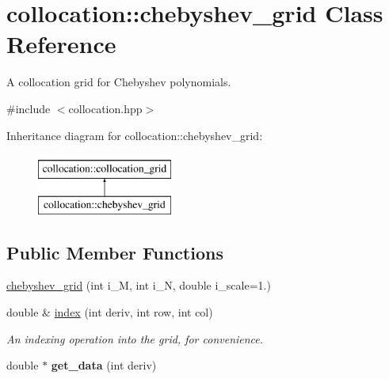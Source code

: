 \hypertarget{classcollocation_1_1chebyshev__grid}{\section{collocation\-:\-:chebyshev\-\_\-grid Class Reference}
\label{classcollocation_1_1chebyshev__grid}
}


A collocation grid for Chebyshev polynomials.  




{\ttfamily \#include $<$collocation.\-hpp$>$}

Inheritance diagram for collocation\-:\-:chebyshev\-\_\-grid\-:\begin{figure}[H]
\begin{center}
\leavevmode
\includegraphics[height=2.000000cm]{classcollocation_1_1chebyshev__grid}
\end{center}
\end{figure}
\subsection*{Public Member Functions}
\begin{DoxyCompactItemize}
\item 
\hyperlink{classcollocation_1_1chebyshev__grid_ad5bf0baabf0f68952faf64df8beaa373}{chebyshev\-\_\-grid} (int i\-\_\-\-M, int i\-\_\-\-N, double i\-\_\-scale=1.)
\item 
double \& \hyperlink{classcollocation_1_1collocation__grid_ae4c6823908ca97d0302ee8bdef30f996}{index} (int deriv, int row, int col)
\begin{DoxyCompactList}\small\item\em An indexing operation into the grid, for convenience. \end{DoxyCompactList}\item 
\hypertarget{classcollocation_1_1collocation__grid_a6f1a7584de56f404ace53d98f1d68437}{double $\ast$ {\bfseries get\-\_\-data} (int deriv)}\label{classcollocation_1_1collocation__grid_a6f1a7584de56f404ace53d98f1d68437}

\end{DoxyCompactItemize}
